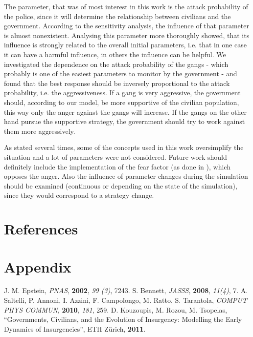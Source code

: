 \documentclass[11pt]{article}
\begin{document}
The parameter, that was of most interest in this work is the attack probability of the police, since it will determine the relationship between civilians and the government. According to the sensitivity analysis, the influence of that parameter is almost nonexistent. Analysing this parameter more thoroughly showed, that its influence is strongly related to the overall initial parameters, i.e. that in one case it can have a harmful influence, in others the influence can be helpful. We investigated the dependence on the attack probability of the gangs - which probably is one of the easiest parameters to monitor by the government - and found that the best response should be inversely proportional to the attack probability, i.e. the aggressiveness. If a gang is very aggressive, the government should, according to our model, be more supportive of the civilian population, this way only the anger against the gangs will increase. If the gangs on the other hand pursue the supportive strategy, the government should try to work against them more aggressively. 

As stated several times, some of the concepts used in this work oversimplify the situation and a lot of parameters were not considered. Future work should definitely include the implementation of the fear factor (as done in \cite{bennett}), which opposes the anger. Also the influence of parameter changes during the simulation should be examined (continuous or depending on the state of the simulation), since they would correspond to a strategy change.

\section{References}

\section{Appendix}
\begin{thebibliography}{sotief}
 J. M. Epstein, \textit{PNAS}, \textbf{2002}, \textit{99 (3)}, 7243.
 S. Bennett, \textit{JASSS}, \textbf{2008}, \textit{11(4)}, 7.  
 A. Saltelli, P. Annoni, I. Azzini, F. Campolongo, M. Ratto, S. Tarantola, \textit{COMPUT PHYS COMMUN}, \textbf{2010}, \textit{181}, 259.
 D. Kouzoupis, M. Rozou, M. Tsopelas, ``Governments, Civilians, and the Evolution of Insurgency: Modelling the Early Dynamics of Insurgencies'', ETH Zürich, \textbf{2011}.
\end{thebibliography}
\end{document}
